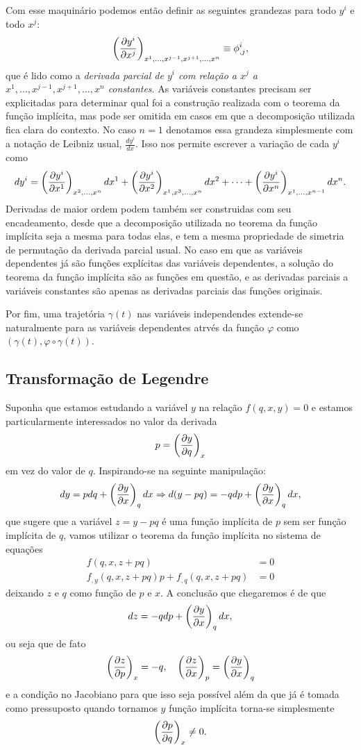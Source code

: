 \documentclass[a4paper, 12pt]{article}
\newcommand{\pd}[3]{\ifblank{#3}{}{\left(}\frac{\partial #1}{\partial #2}\ifblank{#3}{}{\right)_{#3}}}
\theoremstyle{definition}
\theoremstyle{definition}
\begin{document}
Com esse maquinário podemos então definir as seguintes grandezas para todo $y^i$ e todo $x^j$:
$$\pd{y^i}{x^j}{x^1,\dots,x^{j-1},x^{j+1},\dots,x^n}\equiv\phi^i_{,j},$$
que é lido como a \textit{derivada parcial de $y^i$ com relação a $x^j$ a $x^1,\dots,x^{j-1},x^{j+1}
,\dots,x^n$ constantes}. As variáveis constantes precisam ser explicitadas para determinar
qual foi a construção realizada com o teorema da função implícita, mas pode ser omitida em casos
em que a decomposição utilizada fica clara do contexto. No caso $n=1$ denotamos essa grandeza simplesmente 
com a notação de Leibniz usual, $\frac{dy^i}{dx}$. Isso nos permite escrever a variação de cada $y^i$ como
$$dy^i=\pd{y^i}{x^1}{x^2,\dots,x^n}dx^1+\pd{y^i}{x^2}{x^1,x^3,\dots,x^n}dx^2+\cdots+\pd{y^i}{x^n}{x^1,\dots,x^{n-1}}dx^n.$$
Derivadas de maior ordem podem também ser construidas com seu encadeamento, desde que a decomposição utilizada
no teorema da função implícita seja a mesma para todas elas, e tem a mesma propriedade de simetria de permutação 
da derivada parcial usual. No caso em que as variáveis dependentes já são funções explícitas das variáveis
dependentes, a solução do teorema da função implícita são as funções em questão, e as derivadas parciais
a variáveis constantes são apenas as derivadas parciais das funções originais.

Por fim, uma trajetória $\gamma(t)$ nas variáveis independendes extende-se naturalmente para as variáveis
dependentes atrvés da função $\varphi$ como $(\gamma(t), \varphi\circ\gamma(t))$.

\subsection{Transformação de Legendre}

Suponha que estamos estudando a variável $y$ na relação $f(q,x,y)=0$ e estamos particularmente interessados
no valor da derivada 
$$p=\pd{y}{q}{x}$$
em vez do valor de $q$. Inspirando-se na seguinte manipulação:
$$dy=pdq+\pd{y}{x}{q}dx\Rightarrow
d(y-pq)=-qdp+\pd{y}{x}{q}dx,$$
que sugere que a variável $z=y-pq$ é uma função implícita de $p$ sem ser função implícita de $q$, vamos
utilizar o teorema da função implícita no sistema de equações
\begin{align*}
    f(q,x,z+pq)&=0\\
    f_{,y}(q,x,z+pq)p+f_{,q}(q,x,z+pq)&=0
\end{align*}
deixando $z$ e $q$ como função de $p$ e $x$. A conclusão que chegaremos é de que
$$dz=-qdp+\pd{y}{x}{q}dx,$$
ou seja que de fato
$$\pd{z}{p}{x}=-q,\quad\pd{z}{x}{p}=\pd{y}{x}{q}$$
e a condição no Jacobiano para que isso seja possível além da que já é tomada como pressuposto quando
tornamos $y$ função implícita torna-se simplesmente
$$\pd{p}{q}{x}\neq0.$$
\end{document}

